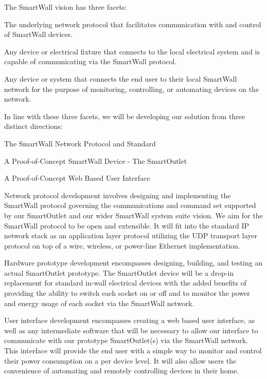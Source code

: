 \documentclass[12pt]{article}
\begin{document}
The SmartWall vision has three facets:
\begin{description}
  \setlength{\itemsep}{0pt}
  \setlength{\parskip}{0pt}
  \setlength{\parsep}{0pt}
\item[SmartWall Protocol:] The underlying network protocol that
  facilitates communication with and control of SmartWall devices.
\item[SmartWall Enabled Devices:] Any device or electrical fixture that
  connects to the local electrical system and is capable of
  communicating via the SmartWall protocol.
\item[SmartWall User Interfaces:] Any device or system that connects
  the end user to their local SmartWall network for the purpose of
  monitoring, controlling, or automating devices on the network.
\end{description}

In line with these three facets, we will be  developing our solution
from three distinct directions:
\begin{description}
  \setlength{\itemsep}{0pt}
  \setlength{\parskip}{0pt}
  \setlength{\parsep}{0pt}
\item[Network:] The SmartWall Network Protocol and Standard
\item[Hardware:] A Proof-of-Concept SmartWall Device - The SmartOutlet
\item[User Interface:] A Proof-of-Concept Web Based User Interface 
\end{description}

Network protocol development involves designing and implementing the
SmartWall protocol governing the communications and command set supported
by our SmartOutlet and our wider SmartWall system suite
vision. We aim for the SmartWall protocol to be open and
extensible. It will fit into the standard IP network stack as an application
layer protocol utilizing the UDP transport layer protocol on top of a
wire, wireless, or power-line Ethernet implementation.

Hardware prototype development encompasses designing,
building, and testing an actual SmartOutlet prototype. The SmartOutlet
device will be a drop-in replacement for standard in-wall electrical
devices with the added benefits of providing the ability to switch
each socket on or off and
to monitor the power and energy usage of each socket via the SmartWall
network.

User interface development encompasses creating a web based user
interface, as well as any intermediate software that will be necessary
to allow our interface to communicate with our prototype
SmartOutlet(s) via the SmartWall network. This interface will provide
the end user with a simple way to monitor and control their power
consumption on a per device level. It will also allow users the
convenience of automating and remotely controlling devices in their home.
\end{document}
